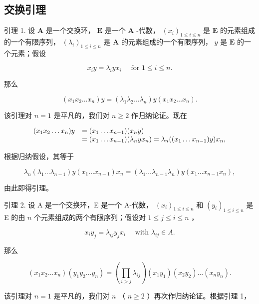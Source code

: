 \subsection{交换引理}

引理 1. 设 \(\mathbf{A}\) 是一个交换环， \(\mathbf{E}\) 是一个 \(\mathbf{A}\) -代数， \((x_{i})_{1\leqslant i\leqslant n}\) 是 \(\mathbf{E}\) 的元素组成的一个有限序列， \((\lambda_i)_{1\leqslant i\leqslant n}\) 是 \(\mathbf{A}\) 的元素组成的一个有限序列， \(y\) 是 \(\mathbf{E}\) 的一个元素；假设

\[
x _ {i} y = \lambda_ {i} y x _ {i} \quad \text { for } 1 \leqslant i \leqslant n.\tag{13}
\]

那么

\[
\left(x _ {1} x _ {2} \dots x _ {n}\right) y = \left(\lambda_ {1} \lambda_ {2} \dots \lambda_ {n}\right) y \left(x _ {1} x _ {2} \dots x _ {n}\right).\tag{14}
\]

该引理对 \(n = 1\) 是平凡的，我们对 \(n \geqslant 2\) 作归纳论证。现在

\[
\begin{array}{r l} (x _ {1} x _ {2} \dots x _ {n}) y & = (x _ {1} \dots x _ {n - 1}) (x _ {n} y) \\ & = (x _ {1} \dots x _ {n - 1}) (\lambda_ {n} y x _ {n}) = \lambda_ {n} ((x _ {1} \dots x _ {n - 1}) y) x _ {n}, \end{array}
\]

根据归纳假设，其等于

\[
\lambda_ {n} \left(\lambda_ {1} \dots \lambda_ {n - 1}\right) y \left(x _ {1} \dots x _ {n - 1}\right) x _ {n} = \left(\lambda_ {1} \dots \lambda_ {n - 1} \lambda_ {n}\right) y \left(x _ {1} \dots x _ {n - 1} x _ {n}\right),
\]

由此即得引理。

引理 2. 设 A 是一个交换环，E 是一个 A-代数， \((x_{i})_{1\leqslant i\leqslant n}\) 和 \((y_{i})_{1\leqslant i\leqslant n}\) 是 E 的由 \(n\) 个元素组成的两个有限序列；假设对 \(1\leqslant j\leqslant i\leqslant n\) ，

\[
x _ {i} y _ {j} = \lambda_ {i j} y _ {j} x _ {i} \quad \text { with } \lambda_ {i j} \in A.\tag{15}
\]

那么

\[
\left(x _ {1} x _ {2} \dots x _ {n}\right) \left(y _ {1} y _ {2} \dots y _ {n}\right) = \left(\prod_ {i > j} \lambda_ {i j}\right) \left(x _ {1} y _ {1}\right) \left(x _ {2} y _ {2}\right) \dots \left(x _ {n} y _ {n}\right).\tag{16}
\]

该引理对 \(n = 1\) 是平凡的，我们对 \(n\) （ \(n \geqslant 2\) ）再次作归纳论证。根据引理 1，

